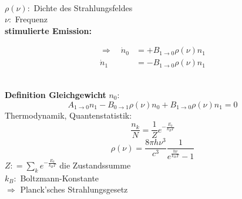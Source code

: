 \\[15pt]
$ \rho(\nu) : $ Dichte des Strahlungsfeldes\\
$ \nu : $ Frequenz\\[5pt]
\textbf{stimulierte Emission:}\\
\begin{minipage}{.5\linewidth}
	\begin{align*}
	\Rightarrow \quad \dot{n}_0 &= + B_{1 \to 0} \rho(\nu) n_1 \\
	\dot{n}_1 &= - B_{1 \to 0} \rho(\nu) n_1
	\end{align*}
\end{minipage}%
\begin{minipage}{.5\linewidth}
	\centering
\end{minipage}%
\\[15pt]
\textbf{Definition Gleichgewicht}
$ n_0 : $
\begin{equation*}
A_{1 \to 0} n_1 - B_{0 \to 1} \rho(\nu) n_0 + B_{1 \to 0} \rho(\nu) n_1 = 0
\end{equation*}
Thermodynamik, Quantenstatistik:
\begin{equation*}
\frac{n_k}{N} = \frac{1}{Z} e^{-\frac{E_k}{k_B T}}
\end{equation*}
\begin{equation*}
\rho(\nu) = \frac{8 \pi h \nu^3}{c^3} \frac{1}{e^{\frac{h \nu}{k_B T}} - 1}
\end{equation*}
$ Z : = \sum_k e^{-\frac{E_k}{k_B T}} $ die Zustandssumme\\
$ k_B : $ Boltzmann-Konstante\\[5pt]
$ \Rightarrow $ Planck'sches Strahlungsgesetz